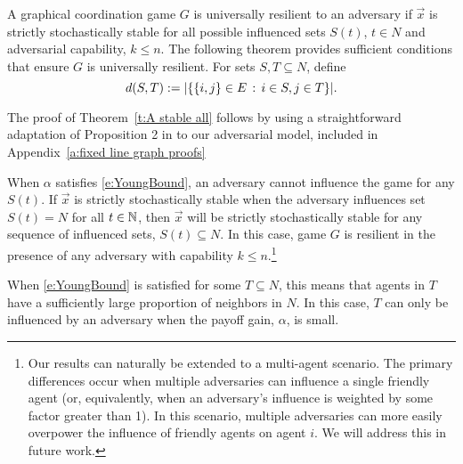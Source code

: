 A graphical coordination game $G$ is universally resilient to an adversary if $\vec{x}$ is strictly stochastically stable for all possible influenced sets $S(t)$, $t\in N$ and adversarial capability, $k\leq n.$ The following theorem provides sufficient conditions that ensure $G$ is universally resilient. For sets $S,T\subseteq N$, define
$$d(S,T) := |\{\{i,j\}\in E\,:\, i\in S, j\in T\}|.$$

\thirdtheorem 


\smallskip

The proof of Theorem~\ref{t:A stable all} follows by using a straightforward adaptation of Proposition 2 in \cite{Young2011} to our adversarial model, included in Appendix~\ref{a:fixed line graph proofs}

When $\alpha$ satisfies \eqref{e:YoungBound}, an adversary cannot influence the game for any $S(t).$ If $\vec{x}$ is strictly stochastically stable when the adversary influences set $S(t)=N$ for all $t\in\mathbb{N}$, then $\vec{x}$ will be strictly stochastically stable for any sequence of influenced sets, $S(t)\subseteq N.$ In this case, game $G$ is resilient in the presence of any adversary with capability $k\leq n$.\footnote{Our results can naturally be extended to a multi-agent scenario. The primary differences occur when multiple adversaries can influence a single friendly agent (or, equivalently, when an adversary's influence is weighted by some factor greater than 1). In this scenario, multiple adversaries can more easily overpower the influence of friendly agents on agent $i$. We will address this in future work.}

When \eqref{e:YoungBound} is satisfied for some $T\subseteq N$, this means that agents in $T$ have a sufficiently large proportion of neighbors in $N$. In this case, $T$ can only be influenced by an adversary when the payoff gain, $\alpha$, is small.

